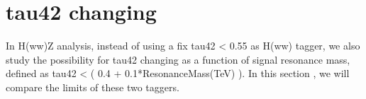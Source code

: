 \newpage
\section{tau42 changing}

In H(ww)Z analysis, instead of using a fix tau42 < 0.55 as H(ww) tagger, we also study the possibility for 
tau42 changing as a function of signal resonance mass, defined as tau42 < ( 0.4 + 0.1*ResonanceMass(TeV) ).
In this section , we will compare the limits of these two taggers. 


\clearpage
